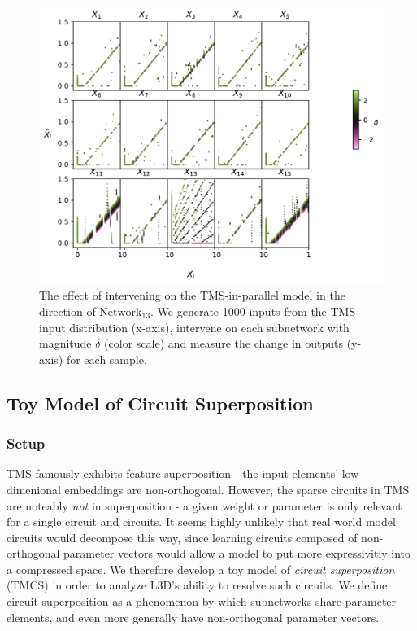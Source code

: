 \documentclass{article}
\theoremstyle{plain}
\theoremstyle{definition}
\theoremstyle{remark}
\begin{document}
\begin{figure}
    \centerline{\includegraphics[width=\columnwidth]{../figures/4_tms_intervention.pdf}}
    \centering
    \caption{The effect of intervening on the TMS-in-parallel model in the direction of $\text{Network}_13$. We generate 1000 inputs from the TMS input distribution (x-axis), intervene on each subnetwork with magnitude $\delta$ (color scale) and measure the change in outputs (y-axis) for each sample.}\label{fig:4_tms_intervention}
\end{figure}

\subsection{Toy Model of Circuit Superposition}

\subsubsection{Setup}


TMS famously exhibits feature superposition - the input elements' low dimenional embeddings are non-orthogonal. However, the sparse circuits in TMS are noteably \textit{not} in superposition - a given weight or parameter is only relevant for a single circuit and circuits. It seems highly unlikely that real world model circuits would decompose this way, since learning circuits composed of non-orthogonal parameter vectors would allow a model to put more expressivitiy into a compressed space. We therefore develop a toy model of \textit{circuit superposition} (TMCS) in order to analyze L3D's ability to resolve such circuits. We define circuit superposition as a phenomenon by which subnetworks share parameter elements, and even more generally have non-orthogonal parameter vectors. 
\end{document}
